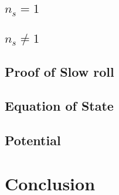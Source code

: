 \documentclass[12pt]{article} %
\begin{document}
\subsection{$n_{s}=1$}

\subsection{$n_{s} \neq 1$}

\subsection{Proof of Slow roll}

\subsection{Equation of State}

\subsection{Potential}

\section{Conclusion}

{}

\end{document}
